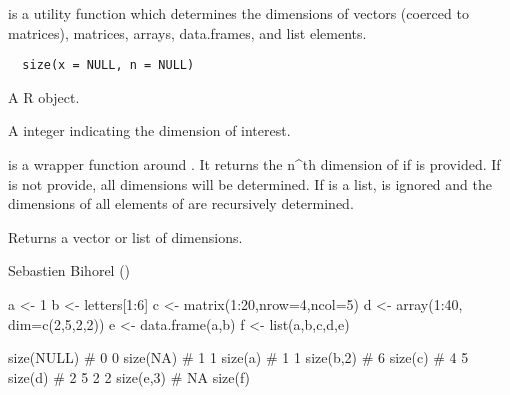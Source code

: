%
\begin{Description}\relax
{} is a utility function which determines the dimensions of vectors
(coerced to matrices), matrices, arrays, data.frames, and list elements.
\end{Description}
%
\begin{Usage}
\begin{verbatim}
  size(x = NULL, n = NULL)
\end{verbatim}
\end{Usage}
%
\begin{Arguments}
\begin{ldescription}
\item[\code{x}] A R object.
\item[\code{n}] A integer indicating the dimension of interest.
\end{ldescription}
\end{Arguments}
%
\begin{Details}\relax
{} is a wrapper function around . It returns the n\textasciicircum{}th
dimension of  if  is provided. If  is not provide,
all dimensions will be determined. If  is a list,  is ignored
and the dimensions of all elements of  are recursively determined.
\end{Details}
%
\begin{Value}
Returns a vector or list of dimensions.
\end{Value}
%
\begin{Author}\relax
Sebastien Bihorel ()
\end{Author}
%
\begin{SeeAlso}\relax
{}
\end{SeeAlso}
%
\begin{Examples}
\begin{ExampleCode}
  a <- 1
  b <- letters[1:6]
  c <- matrix(1:20,nrow=4,ncol=5)
  d <- array(1:40, dim=c(2,5,2,2))
  e <- data.frame(a,b)
  f <- list(a,b,c,d,e)

  size(NULL) # 0 0
  size(NA)   # 1 1
  size(a)    # 1 1
  size(b,2)  # 6
  size(c)    # 4 5
  size(d)    # 2 5 2 2
  size(e,3)  # NA
  size(f)
\end{ExampleCode}
\end{Examples}
